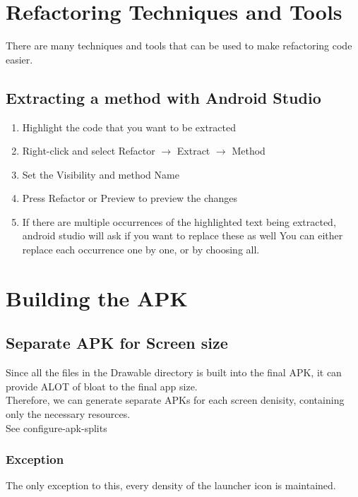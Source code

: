 \documentclass[]{article}
\begin{document}
\section{Refactoring Techniques and Tools}
There are many techniques and tools that can be used to make refactoring code easier.
\subsection{Extracting a method with Android Studio}
\begin{enumerate}
	\item  Highlight the code that you want to be extracted
	\item Right-click and select Refactor $\rightarrow$ Extract $\rightarrow$ Method
	\item Set the Visibility and method Name 
	\item Press Refactor or Preview to preview the changes
	\item If there are multiple occurrences of the highlighted text being extracted, android studio will ask if you want to replace these as well 
	\subitem You can either replace each occurrence one by one, or by choosing all.
\end{enumerate}

\section{Building the APK}
\subsection{Separate APK for Screen size}
Since all the files in the Drawable directory is built into the final APK, it can provide ALOT of bloat to the final app size.\\
Therefore, we can generate separate APKs for each screen denisity, containing only the necessary resources.  
\\
See configure-apk-splits
\subsubsection{Exception}
The only exception to this, every density of the launcher icon is maintained.
\end{document}
